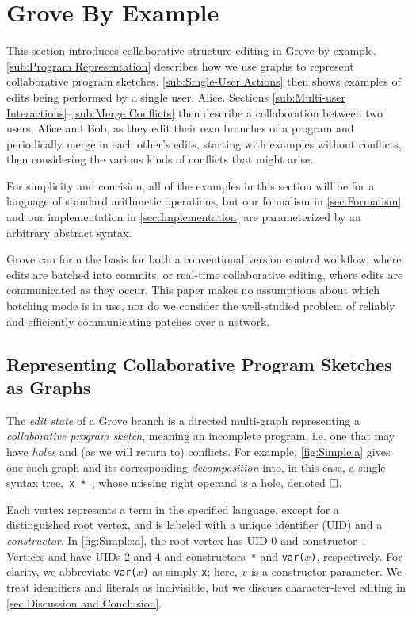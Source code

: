 
\section{Grove By Example}%
\label{sec:Grove By Example}

This section introduces collaborative structure editing in Grove by example.
\autoref{sub:Program Representation} describes how we use graphs to represent collaborative program sketches. 
\autoref{sub:Single-User Actions} then shows examples of edits being performed by a single user, Alice. 
Sections \ref{sub:Multi-user Interactions}--\ref{sub:Merge Conflicts} then describe a collaboration between two users, Alice and Bob,
as they edit their own branches of a program and periodically merge in each other's edits, starting with examples without conflicts, then considering the various kinds of conflicts that might arise.

For simplicity and concision, all of the examples in this section will be for a 
language of standard arithmetic operations, 
but our formalism in \autoref{sec:Formalism} and our implementation in \autoref{sec:Implementation} are parameterized by an arbitrary abstract syntax.

\figureSimple


Grove can form the basis for both a conventional version control workflow,
where edits are batched into commits, or real-time collaborative editing, 
where edits are communicated as they occur. This paper makes no assumptions about which batching mode is in use, nor do we consider the well-studied problem of reliably and efficiently communicating patches over a network.

\subsection{Representing Collaborative Program Sketches as Graphs}%
\label{sub:Program Representation}

The \textit{edit state} of a Grove branch is a directed multi-graph representing a \emph{collaborative program sketch}, meaning an incomplete program, i.e. one that may have \emph{holes} and (as we will return to) conflicts. 
For example, \autoref{fig:Simple:a} gives one such graph and its corresponding \emph{decomposition} into, in this case, a single syntax tree,~\texttt{x * \hole},
whose missing right operand is a hole, denoted $\square$.

Each vertex represents a term in the specified language, except for a distinguished root vertex, 
and is labeled with a unique identifier (UID) and a \emph{constructor}. 
In \autoref{fig:Simple:a}, the root vertex has UID 0 and constructor~\textbullet. 
Vertices \vSimpleTimes{} and \vSimpleX{} have UIDs 2 and 4 and constructors~\texttt{*} and \texttt{var(}$x$\texttt{)}, respectively.
For clarity, we abbreviate \texttt{var(}$x$\texttt{)} as simply \texttt{x}; here, $x$ is a constructor parameter. We treat identifiers and literals as indivisible, but we discuss character-level editing in \autoref{sec:Discussion and Conclusion}.

